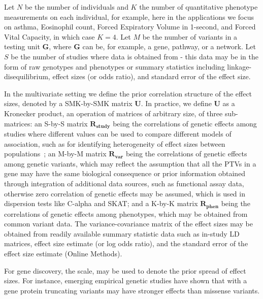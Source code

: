 \documentclass{nature}
\def\bs{\boldsymbol}
\begin{document}
Let $N$ be the number of individuals and $K$ the number of quantitative phenotype measurements on each individual, for example, here in the applications we focus on asthma, Eosinophil count, Forced Expiratory Volume in 1-second, and Forced Vital Capacity, in which case $K=4$. Let $M$ be the number of variants in a testing unit ${\bs G}$, where ${\bs G}$ can be, for example, a gene, pathway, or a network. Let $S$ be the number of studies where data is obtained from - this data may be in the form of raw genotypes and phenotypes or summary statistics including linkage-disequilibrium, effect sizes (or odds ratio), and standard error of the effect size.

In the multivariate setting we define the prior correlation structure of the effect sizes, denoted by a SMK-by-SMK matrix $\mathbf{U}$. In practice, we define $\mathbf{U}$ as a Kronecker product, an operation of matrices of arbitrary size, of three sub-matrices: an S-by-S matrix $\mathbf{R_{\textrm{study}}}$ being the correlations of genetic effects among studies where different values can be used to compare different models of association, such as for identifying heterogeneity of effect sizes between populations~\cite{band2013imputation}; an M-by-M matrix $\mathbf{R_{\textrm{var}}}$ being the correlations of genetic effects among genetic variants, which may reflect the assumption that all the PTVs in a gene may have the same biological consequence\cite{macarthur,rivas2013assessing,rivas2015effect} or prior information obtained through integration of additional data sources, such as functional assay data\cite{majithia2014rare,findlay2014saturation}, otherwise zero correlation of genetic effects may be assumed, which is used in dispersion tests like C-alpha\cite{calpha,clarke2013flexible} and SKAT\cite{skat}; and a K-by-K matrix $\mathbf{R_{\textrm{phen}}}$ being the correlations of genetic effects among phenotypes, which may be obtained from common variant data\cite{cotsapas2011pervasive,solovieff2013pleiotropy,gencorr2015}. The variance-covariance matrix of the effect sizes may be obtained from readily available summary statistic data such as in-study LD matrices, effect size estimate (or log odds ratio), and the standard error of the effect size estimate (Online Methods).

For gene discovery, the scale, may be used to denote the prior spread of effect sizes. For instance, emerging empirical genetic studies have shown that with a gene protein truncating variants may have stronger effects than missense variants\cite{do2015exome}.
\end{document}
